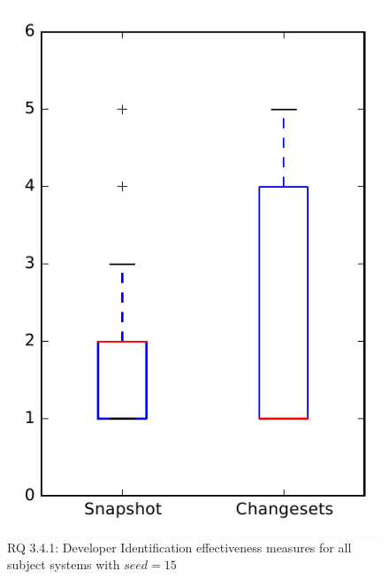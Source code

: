 
\begin{figure}
\centering
\includegraphics[height=0.4\textheight]{figures/dit_seed/rq1_overview_15}
\caption{RQ 3.4.1: Developer Identification effectiveness measures for all subject systems with $seed=15$}
\label{fig:dit_seed:rq1:overview}
\end{figure}
